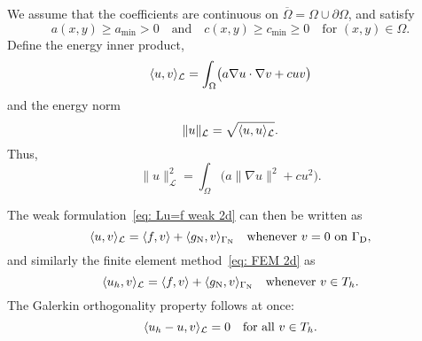We assume that the coefficients are continuous on
$\overline{\Omega}=\Omega\cup\partial\Omega$, and satisfy
\[
a(x,y)\ge a_{\min}>0\quad\text{and}\quad c(x,y)\ge c_{\min}\ge0
    \quad\text{for $(x,y)\in\Omega$.}
\]
Define the energy inner product,
\[
\langle u,v\rangle_{\mathcal{L}}=\int_\Omega\bigl(a\nabla u\cdot\nabla v
    +cuv\bigr)
\]
and the energy norm
\[
\|u\|_{\mathcal{L}}=\sqrt{\langle u,u\rangle_{\mathcal{L}}}.
\]
Thus,
\[
\|u\|_{\mathcal{L}}^2=\int_\Omega\bigl(a\|\nabla u\|^2+cu^2\bigr).
\]

The weak formulation~\eqref{eq: Lu=f weak 2d} can then be written as
\[
\langle u,v\rangle_{\mathcal{L}}=\langle f,v\rangle+\langle g_{\mathrm{N}},v\rangle_{\Gamma_{\mathrm{N}}}
\quad\text{whenever $v=0$ on $\Gamma_{\mathrm{D}}$,}
\]
and similarly the finite element method~\eqref{eq: FEM 2d} as
\[
\langle u_h,v\rangle_{\mathcal{L}}=\langle f,v\rangle+\langle g_{\mathrm{N}},v\rangle_{\Gamma_{\mathrm{N}}}
\quad\text{whenever $v\in T_h$.}
\]
The Galerkin orthogonality property follows at once:
\[
\langle u_h-u,v\rangle_{\mathcal{L}}=0\quad\text{for all $v\in T_h$.}
\]






